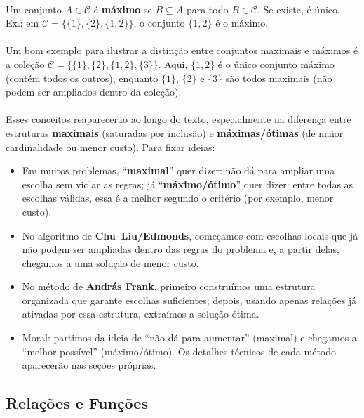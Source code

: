 \documentclass[12pt,a4paper]{article}
\begin{document}
\paragraph{}
Um conjunto \(A\in\mathcal{C}\) é \textbf{máximo} se \(B\subseteq A\) para todo \(B\in\mathcal{C}\). Se existe, é único. Ex.: em \(\mathcal{C}=\big\{\{1\},\{2\},\{1,2\}\big\}\), o conjunto \(\{1,2\}\) é o máximo.

\paragraph{}
Um bom exemplo para ilustrar a distinção entre conjuntos maximais e máximos é a coleção \(\mathcal{C}=\big\{\{1\},\{2\},\{1,2\},\{3\}\big\}\). Aqui, \(\{1,2\}\) é o único conjunto máximo (contém todos os outros), enquanto \(\{1\}\), \(\{2\}\) e \(\{3\}\) são todos maximais (não podem ser ampliados dentro da coleção).

\paragraph{}
Esses conceitos reaparecerão ao longo do texto, especialmente na diferença entre estruturas \textbf{maximais} (saturadas por inclusão) e \textbf{máximas/ótimas} (de maior cardinalidade ou menor custo). Para fixar ideias:
\begin{itemize}
    \item Em muitos problemas, “\textbf{maximal}” quer dizer: não dá para ampliar uma escolha sem violar as regras; já “\textbf{máximo/ótimo}” quer dizer: entre todas as escolhas válidas, essa é a melhor segundo o critério (por exemplo, menor custo).
    \item No algoritmo de \textbf{Chu--Liu/Edmonds}, começamos com escolhas locais que já não podem ser ampliadas dentro das regras do problema e, a partir delas, chegamos a uma solução de menor custo.
    \item No método de \textbf{András Frank}, primeiro construímos uma estrutura organizada que garante escolhas suficientes; depois, usando apenas relações já ativadas por essa estrutura, extraímos a solução ótima.
    \item Moral: partimos da ideia de “não dá para aumentar” (maximal) e chegamos a “melhor possível” (máximo/ótimo). Os detalhes técnicos de cada método aparecerão nas seções próprias.
\end{itemize}

\subsection{Relações e Funções}
\end{document}
